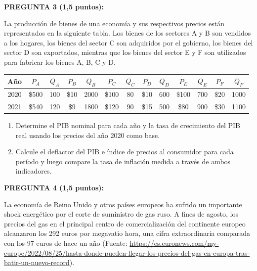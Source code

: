 \documentclass[11pt,addpoints]{article}
\begin{document}
\vspace{0.3cm}
\textbf{PREGUNTA 3 (1,5 puntos):}  

La producción de bienes de una economía y sus respectivos precios están representados en la siguiente tabla. Los bienes de los sectores A y B son vendidos a los hogares, los bienes del sector C son adquiridos por el gobierno, los bienes del sector D son exportados, mientras que los bienes del sector E y F son utilizados para fabricar los bienes A, B, C y D.  

\begin{center}
\begin{tabular}{c c c c c c c c c c c c c}
\toprule
\textbf{Año} & $P_A$ & $Q_A$ & $P_B$ & $Q_B$ & $P_C$ & $Q_C$ & $P_D$ & $Q_D$ & $P_E$ & $Q_E$ & $P_F$ & $Q_F$ \\
\midrule
2020 & \$500 & 100 & \$10 & 2000 & \$100 & 80 & \$10 & 600 & \$100 & 700 & \$20 & 1000 \\
2021 & \$540 & 120 & \$9 & 1800 & \$120 & 90 & \$15 & 500 & \$80  & 900 & \$30  & 1100  \\
\bottomrule
\end{tabular}
\end{center}
\newpage
\vspace*{0.1cm}
\begin{enumerate}[label=\alph*)]
    \item Determine el PIB nominal para cada año y la tasa de crecimiento del PIB real usando los precios del año 2020 como base.  
    \item Calcule el deflactor del PIB e índice de precios al consumidor para cada período y luego compare la tasa de inflación medida a través de ambos indicadores.  
\end{enumerate}

\vspace*{0.1cm}

\textbf{PREGUNTA  4 (1,5 puntos):}  

La economía de Reino Unido y otros países europeos ha sufrido un importante shock energético por el corte de suministro de gas ruso. A fines de agosto, los precios del gas en el principal centro de comercialización del continente europeo alcanzaron los 292 euros por megavatio hora, una cifra extraordinaria comparada con los 97 euros de hace un año (Fuente: \url{https://es.euronews.com/my-europe/2022/08/25/hasta-donde-pueden-llegar-los-precios-del-gas-en-europa-tras-batir-un-nuevo-record}).  
\end{document}

